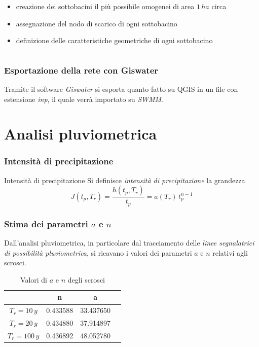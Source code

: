 \documentclass{beamer}
\begin{document}
\begin{frame}
\begin{columns}
  \begin{column}{.5\textwidth}
   \begin{itemize}[<+->]
    \item creazione dei sottobacini il più possibile omogenei di area $1\,ha$ circa
     \item assegnazione del nodo di scarico di ogni sottobacino
     \item definizione delle caratteristiche geometriche di ogni sottobacino
   \end{itemize}
  \end{column}
 \end{columns}
\end{frame}

\begin{frame}
 \frametitle{Esportazione della rete con Giswater}
 Tramite il software \emph{Giswater} si esporta quanto fatto su QGIS in un file con estensione \emph{inp}, il quale verrà importato su \emph{SWMM}.
\end{frame}




\section{Analisi pluviometrica}
\begin{frame}
    \frametitle{Intensità di precipitazione}
    
    \begin{block}{Intensità di precipitazione}
     Si definisce \emph{intensità di precipitazione} la grandezza
     \begin{equation}
     \label{eq:intensita_precipitazione}
      J(t_p, T_r) = \dfrac{h(t_p, T_r)}{t_p} = a(T_r)\,t_p^{n-1}
     \end{equation}
    \end{block}
\end{frame}

\begin{frame}
 \frametitle{Stima dei parametri $a$ e $n$}
 
 Dall'analisi pluviometrica, in particolare dal tracciamento delle \emph{linee segnalatrici di possibilità pluviometrica}, si ricavano i valori dei parametri $a$ e $n$ relativi agli scrosci.
 \begin{table}
 \caption{Valori di $a$ e $n$ degli scrosci}
  \begin{tabular}{cccc}
  \toprule
  &         n &          a \\
  \midrule
  $T_r = 10\,y$  &  0.433588 &  33.437650 \\
  $T_r = 20\,y$  &  0.434880 &  37.914897 \\
  $T_r = 100\,y$&  0.436892 &  48.052780 \\
  \bottomrule
  \end{tabular}
 \end{table}

\end{frame}
\end{document}
